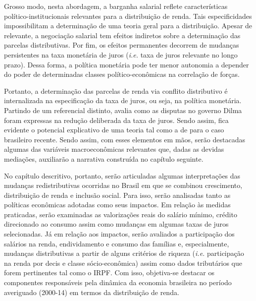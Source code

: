 Grosso modo, nesta abordagem, a
barganha salarial reflete características político-institucionais relevantes para a distribuição de
renda. Tais especificidades impossibilitam a determinação de uma teoria geral para a distribuição. Apesar de relevante, a negociação salarial tem efeitos indiretos sobre a
determinação das parcelas distributivas. Por fim, os efeitos permanentes decorrem de mudanças persistentes na taxa monetária de juros (\textit{i.e.} taxa de juros relevante no longo prazo).
Dessa forma, a política monetária pode ter menor autonomia a depender do poder de
determinadas classes político-econômicas na correlação de forças. 

Portanto, a determinação das parcelas de renda via conflito distributivo é internalizada na especificação da taxa de juros, ou seja, na política monetária. Partindo de um referencial distinto, \textcite{singer_cutucando_2015} avalia como as disputas no governo Dilma foram expressas na redução deliberada da taxa de juros. Sendo assim, fica evidente o potencial explicativo de uma teoria tal como a de \textcite{pivetti_essay_1992} para o caso brasileiro recente. Sendo assim, com esses elementos em mãos, serão destacadas algumas das variáveis macroeconômicas relevantes que, dadas as devidas mediações, auxiliarão a narrativa construída no capítulo seguinte.

No capítulo descritivo, portanto, serão articuladas algumas interpretações das mudanças redistributivas ocorridas no Brasil em que se combinou crescimento, distribuição de renda e inclusão social. Para isso, serão analisadas tanto as políticas econômicas adotadas como seus impactos. Em relação às medidas praticadas, serão examinadas as valorizações reais do salário mínimo, crédito direcionado ao consumo assim como mudanças em algumas taxas de juros selecionadas. Já em relação aos impactos, serão avaliados a participação dos salários na renda, endividamento e consumo das famílias e, especialmente, mudanças distributivas a partir de alguns critérios de riqueza (\textit{i.e.} participação na renda por decis e classe sócio-econômica) assim como dados tributários que forem pertinentes tal como o IRPF. Com isso, objetiva-se destacar os componentes responsáveis pela dinâmica da economia brasileira no período averiguado (2000-14) em termos da distribuição de renda. 


